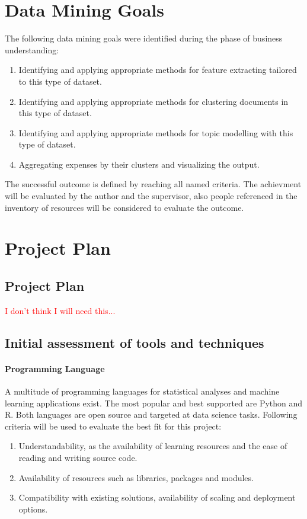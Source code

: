 \section{Data Mining Goals}
The following data mining goals were identified during the phase of business understanding:

\begin{enumerate}
\item Identifying and applying appropriate methods for feature extracting tailored to this type of dataset.
\item Identifying and applying appropriate methods for clustering documents in this type of dataset.
\item Identifying and applying appropriate methods for topic modelling with this type of dataset.
\item Aggregating expenses by their clusters and visualizing the output.
\end{enumerate}

The successful outcome is defined by reaching all named criteria. The achievment will be evaluated by the author and the supervisor, also people referenced in the inventory of resources will be considered to evaluate the outcome.


\section{Project Plan}

\subsection{Project Plan}
\textcolor{red}{I don't think I will need this...}

\subsection{Initial assessment of tools and techniques}

\paragraph{Programming Language}
A multitude of programming languages for statistical analyses and machine learning applications exist. The most popular and best supported are Python and R. Both languages are open source and targeted at data science tasks.
Following criteria will be used to evaluate the best fit for this project:
\begin{enumerate}
\item Understandability, as the availability of learning resources and the ease of reading and writing source code.
\item Availability of resources such as libraries, packages and modules.
\item Compatibility with existing solutions, availability of scaling and deployment options.
\end{enumerate}

